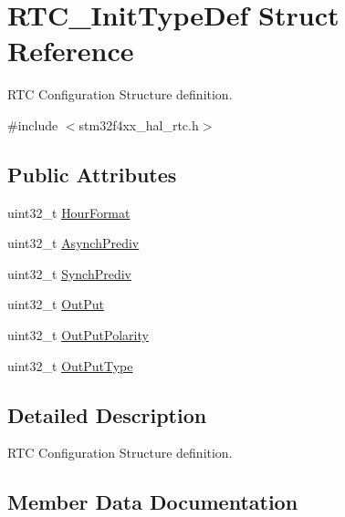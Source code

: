 \hypertarget{struct_r_t_c___init_type_def}{}\section{R\+T\+C\+\_\+\+Init\+Type\+Def Struct Reference}
\label{struct_r_t_c___init_type_def}


R\+TC Configuration Structure definition.  




{\ttfamily \#include $<$stm32f4xx\+\_\+hal\+\_\+rtc.\+h$>$}

\subsection*{Public Attributes}
\begin{DoxyCompactItemize}
\item 
uint32\+\_\+t \hyperlink{struct_r_t_c___init_type_def_aa7dff3583cd79a5a3f9868a56ffd31ee}{Hour\+Format}
\item 
uint32\+\_\+t \hyperlink{struct_r_t_c___init_type_def_a8666a1fe64fe25f9b951219561a07a95}{Asynch\+Prediv}
\item 
uint32\+\_\+t \hyperlink{struct_r_t_c___init_type_def_ac27c42530b6ba86654ec476cd0d020fb}{Synch\+Prediv}
\item 
uint32\+\_\+t \hyperlink{struct_r_t_c___init_type_def_acd1593d55123feca6c3cae142134c294}{Out\+Put}
\item 
uint32\+\_\+t \hyperlink{struct_r_t_c___init_type_def_a14365da1f80863621341cf4a6a8d4e67}{Out\+Put\+Polarity}
\item 
uint32\+\_\+t \hyperlink{struct_r_t_c___init_type_def_a2c4a2bd3cfae39882e657e653e45185a}{Out\+Put\+Type}
\end{DoxyCompactItemize}


\subsection{Detailed Description}
R\+TC Configuration Structure definition. 

\subsection{Member Data Documentation}
